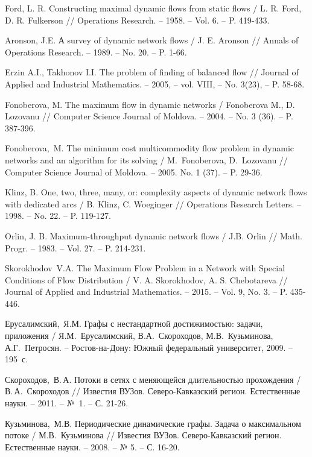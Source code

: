 \documentclass[a4paper,12pt]{article}
\begin{document}
	
	\begin{thebibliography}{90}	\large
	
 Ford, L. R. Constructing maximal dynamic flows from static flows / L. R. Ford, D. R. Fulkerson // Operations Research. -- 1958. -- Vol. 6. -- P. 419-433.	
	
 Aronson, J.E. А survey of dynamic network flows / J. E. Aronson // Annals of Operations Research. -- 1989. -- No. 20. -- P. 1-66.

 Erzin A.I., Takhonov I.I. The problem of finding of balanced flow // Journal of Applied and Industrial Mathematics. -- 2005, -- vol. VIII, -- No. 3(23), -- P. 58-68.

 Fonoberova, M. The maximum flow in dynamic networks / Fonoberova M., D. Lozovanu // Computer Science Journal of Moldova. -- 2004. -- No. 3 (36). -- P. 387-396.

 Fonoberova,~M. The minimum cost multicommodity flow problem in dy\-na\-mic networks and an algorithm for its solving / M.~Fonoberova, D.~Lo\-zo\-vanu // Computer Science Journal of Moldova. -- 2005. No. 1 (37). -- P. 29-36.

 Klinz, B. One, two, three, many, or: complexity aspects of dynamic network flows with dedicated arcs / B. Klinz, C. Woeginger // Operations Research Letters. -- 1998. -- No. 22. -- P. 119-127.

 Orlin, J. B. Maximum-throughput dynamic network flows / J.B. Orlin // Math. Progr. -- 1983. -- Vol. 27. -- P. 214-231.

 Skorokhodov~V.A. The Maximum Flow Problem in a Network with Special Conditions of Flow Distribution / V. A. Skorokhodov, A. S. Chebotareva // Journal of Applied and Industrial Mathematics. -- 2015. -- Vol. 9, No. 3. -- P. 435-446.	


 Ерусалимский,~Я.М. Графы с нестандартной достижимостью: задачи, приложения / Я.М.~Ерусалимский, В.А.~Скороходов, М.В.~Кузьминова, А.Г.~Петросян. -- Ростов-на-Дону: Южный федеральный университет, 2009. -- 195~с.

 Скороходов,~В.\,А. Потоки в сетях с меняющейся длительностью прохождения / В.\,А.~Скороходов // Известия ВУЗов. Северо-Кавказский регион. Естественные науки. -- 2011. -- №~1. -- С. 21-26.

 Кузьминова,~М.В. Периодические динамические графы. Задача о максимальном потоке / М.В.~Кузьминова // Известия ВУЗов. Северо-Кавказский регион. Естественные науки. -- 2008. -- № 5. -- С. 16-20.


\end{thebibliography}
\end{document}
